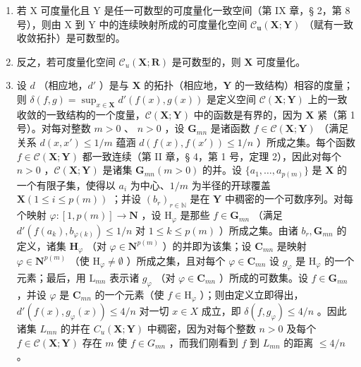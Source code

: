 \begin{enumerate}
\def\labelenumi{\alph{enumi})}
\item
  若 X 可度量化且 Y 是任一可数型的可度量化一致空间（第 IX 章，§ 2，第 8 号），则由 X 到 Y 中的连续映射所成的可度量化空间 \(\mathcal{C}_{\mathbf{u}}(\mathbf{X};\mathbf{Y})\) （赋有一致收敛拓扑）是可数型的。
\item
  反之，若可度量化空间 \(\mathcal{C}_{u}(\mathbf{X};\mathbf{R})\) 是可数型的，则 \(\mathbf{X}\) 可度量化。
\item
  设 \(d\) （相应地，\(d'\) ）是与 \(\mathbf{X}\) 的拓扑（相应地，\(\mathbf{Y}\) 的一致结构）相容的度量；则 \(\delta(f, g) = \sup_{x \in \mathbf{X}} d'(f(x), g(x))\) 是定义空间 \(\mathcal{C}(\mathbf{X}; \mathbf{Y})\) 上的一致收敛的一致结构的一个度量，\(\mathcal{C}(\mathbf{X}; \mathbf{Y})\) 中的函数是有界的，因为 \(\mathbf{X}\) 紧（第 1 号）。对每对整数 \(m > 0\) 、 \(n > 0\) ，设 \(\mathbf{G}_{mn}\) 是诸函数 \(f \in \mathcal{C}(\mathbf{X};\mathbf{Y})\) （满足关系 \(d(x,x') \leqslant 1 / m\) 蕴涵 \(d(f(x),f(x')) \leqslant 1 / n\) ）所成之集。每个函数 \(f \in \mathcal{C}(\mathbf{X};\mathbf{Y})\) 都一致连续（第 II 章，§ 4，第 1 号，定理 2），因此对每个 \(n > 0\) ，\(\mathcal{C}(\mathbf{X};\mathbf{Y})\) 是诸集 \(\mathbf{G}_{mn}(m > 0)\) 的并。设 \(\{a_1,\dots ,a_{p(m)}\}\) 是 \(\mathbf{X}\) 的一个有限子集，使得以 \(a_i\) 为中心、\(1 / m\) 为半径的开球覆盖 \(\mathbf{X}(1\leqslant i\leqslant p(m))\) ；并设 \((b_r)_{r\in \mathbb{N}}\) 是在 \(\mathbf{Y}\) 中稠密的一个可数序列。对每个映射 \(\varphi :[1,p(m)]\to \mathbf{N}\) ，设 \(\mathrm{H}_{\varphi}\) 是那些 \(f\in \mathbf{G}_{mn}\) （满足 \(d'(f(a_k),b_{\varphi (k)})\leqslant 1 / n\) 对 \(1\leqslant k\leqslant p(m)\) ）所成之集。由诸 \(b_r,\mathbf{G}_{mn}\) 的定义，诸集 \(\mathbf{H}_{\varphi}\) （对 \(\varphi \in \mathbf{N}^{p(m)}\) ）的并即为该集；设 \(\mathbf{C}_{mn}\) 是映射 \(\varphi \in \mathbf{N}^{p(m)}\) （使 \(\mathrm{H}_{\varphi}\neq \emptyset\) ）所成之集，且对每个 \(\varphi \in \mathbf{C}_{mn}\) 设 \(g_{\varphi}\) 是 \(\mathrm{H}_{\varphi}\) 的一个元素；最后，用 \(\mathrm{L}_{mn}\) 表示诸 \(g_{\varphi}\) （对 \(\varphi \in \mathbf{C}_{mn}\) ）所成的可数集。设 \(f\in \mathbf{G}_{mn}\) ，并设 \(\varphi\) 是 \(\mathbf{C}_{mn}\) 的一个元素（使 \(f\in \mathrm{H}_{\varphi}\) ）；则由定义立即得出，\(d'(f(x),g_{\varphi}(x))\leqslant 4 / n\) 对一切 \(x\in X\) 成立，即 \(\delta (f,g_{\varphi})\leqslant 4 / n\) 。因此诸集 \(L_{mn}\) 的并在 \(C_u(\mathbf{X};\mathbf{Y})\) 中稠密，因为对每个整数 \(n > 0\) 及每个 \(f\in \mathcal{C}(\mathbf{X};\mathbf{Y})\) 存在 \(m\) 使 \(f\in G_{mn}\) ，而我们刚看到 \(f\) 到 \(L_{mn}\) 的距离 \(\leqslant 4 / n\) 。

\end{enumerate}
